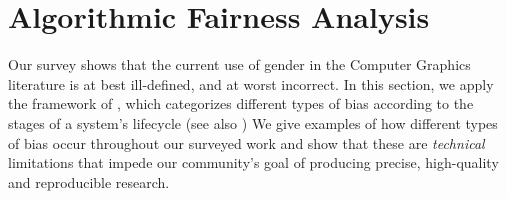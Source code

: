 \documentclass[nonacm,sigconf,review,balance=false]{acmart}
\begin{document}

\section{Algorithmic Fairness Analysis}

Our survey shows that the current use of gender in the Computer Graphics literature is at best ill-defined, and at worst incorrect.
In this section,
we apply the framework of \citet{Suresh2021}, which categorizes different types of bias according to the stages of a system's lifecycle 
(see also \cite{fairnesssurvey,FriedmanAndNissenbaum,olteanu2019social})
We give examples of how different types of bias occur throughout our surveyed work and show that these are \emph{technical} limitations that impede our community's goal of producing precise, high-quality and reproducible research.
\end{document}
